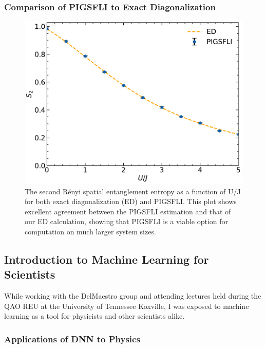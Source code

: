 \subsubsection{Comparison of PIGSFLI to Exact Diagonalization} \label{results}
\begin{figure}[H]
\centering
\includegraphics[scale=0.5]{../figures/renyi_spatial.pdf}
\caption{The second Rényi spatial entanglement entropy as a function of U/J for both exact diagonalization (ED) and PIGSFLI. This plot shows excellent agreement between the PIGSFLI estimation and that of our ED calculation, showing that PIGSFLI is a viable option for computation on much larger system sizes.}
\label{fig:renyi_spatial}
\end{figure}

\subsection{Introduction to Machine Learning for Scientists}

While working with the DelMaestro group and attending lectures held during the QAO REU at the University of Tennessee Koxville, I was exposed to machine learning as a tool for physicists and other scientists alike. 

\subsubsection{Applications of DNN to Physics}

